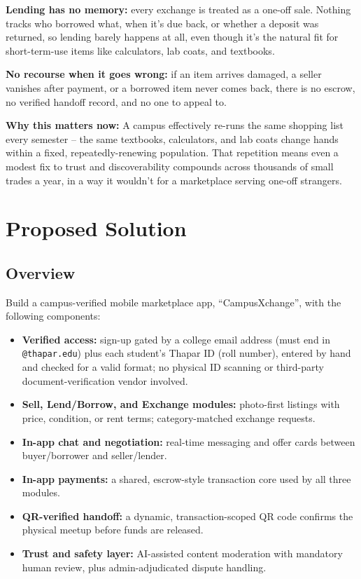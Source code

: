 \documentclass[11pt]{article}
\begin{document}
\textbf{Lending has no memory:} every exchange is treated as a one-off sale. Nothing tracks who borrowed what, when it's due back, or whether a deposit was returned, so lending barely happens at all, even though it's the natural fit for short-term-use items like calculators, lab coats, and textbooks.

\textbf{No recourse when it goes wrong:} if an item arrives damaged, a seller vanishes after payment, or a borrowed item never comes back, there is no escrow, no verified handoff record, and no one to appeal to.

\textbf{Why this matters now:} A campus effectively re-runs the same shopping list every semester -- the same textbooks, calculators, and lab coats change hands within a fixed, repeatedly-renewing population. That repetition means even a modest fix to trust and discoverability compounds across thousands of small trades a year, in a way it wouldn't for a marketplace serving one-off strangers.

\section{Proposed Solution}

\subsection{Overview}
Build a campus-verified mobile marketplace app, ``CampusXchange'', with the following components:

\begin{itemize}[leftmargin=*]
\item \textbf{Verified access:} sign-up gated by a college email address (must end in \texttt{@thapar.edu}) plus each student's Thapar ID (roll number), entered by hand and checked for a valid format; no physical ID scanning or third-party document-verification vendor involved.
\item \textbf{Sell, Lend/Borrow, and Exchange modules:} photo-first listings with price, condition, or rent terms; category-matched exchange requests.
\item \textbf{In-app chat and negotiation:} real-time messaging and offer cards between buyer/borrower and seller/lender.
\item \textbf{In-app payments:} a shared, escrow-style transaction core used by all three modules.
\item \textbf{QR-verified handoff:} a dynamic, transaction-scoped QR code confirms the physical meetup before funds are released.
\item \textbf{Trust and safety layer:} AI-assisted content moderation with mandatory human review, plus admin-adjudicated dispute handling.
\end{itemize}
\end{document}
